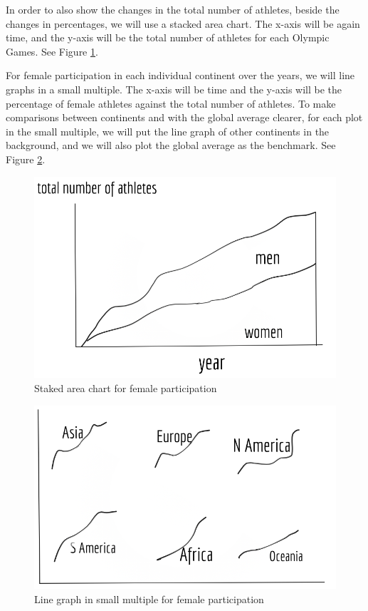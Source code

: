 \documentclass[
]{article}
\begin{document}
In order to also show the changes in the total number of athletes, beside the changes in percentages, we will use a stacked area chart. The x-axis will be again time, and the y-axis will be the total number of athletes for each Olympic Games. See Figure \ref{fig:figure14}.

For female participation in each individual continent over the years, we will line graphs in a small multiple. The x-axis will be time and the y-axis will be the percentage of female athletes against the total number of athletes. To make comparisons between continents and with the global average clearer, for each plot in the small multiple, we will put the line graph of other continents in the background, and we will also plot the global average as the benchmark. See Figure \ref{fig:figure15}.

\begin{figure}

{\centering \includegraphics[width=0.75\linewidth]{static/pics/3} 

}

\caption{Staked area chart for female participation}\label{fig:figure14}
\end{figure}

\begin{figure}

{\centering \includegraphics[width=0.75\linewidth]{static/pics/4} 

}

\caption{Line graph in small multiple for female participation}\label{fig:figure15}
\end{figure}
\end{document}
